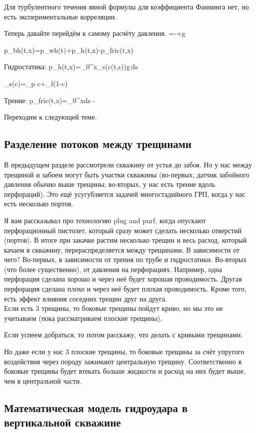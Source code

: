 \documentclass[main.tex]{subfiles}
\begin{document}
Для турбулентного течения явной формулы для коэффициента Фаннинга нет, но есть экспериментальные корреляции.

Теперь давайте перейдём к самому расчёту давления.
\beq
{}=-+\overline{\rho}g\sin{\theta}
\eeq

\beq
p_{bh}(t,x)=p_{wh}(t)+\Delta p_h(t,x)-\Delta p_{fric}(t,x)
\eeq

Гидростатика:
\beq
\Delta p_h(t,x)=\int\limits_{0}^{x}\rho_s(c(t,s))g\,ds
\eeq

\beq
\rho_s(c)=\rho_p c+\rho_f\left(1-c\right)
\eeq

Трение:
\beq
\Delta p_{fric}(t,x)=\int\limits_0^xds - 
\eeq

Переходим к следующей теме.

\subsection{Разделение потоков между трещинами}

В предыдущем разделе рассмотрели скважину от устья до забоя.
Но у нас между трещиной и забоем могут быть участки скважины (во-первых, датчик забойного давления обычно выше трещины; во-вторых, у нас есть трение вдоль перфораций).
Это ещё усугубляется задачей многостадийного ГРП, когда у нас есть несколько портов.

Я вам рассказывал про технологию plug and purf, когда опускают перфорационный пистолет, который сразу может сделать несколько отверстий (портов).
В итоге при закачке растим несколько трещин и весь расход, который качаем в скважину, перераспределяется между трещинами.
В зависимости от чего?
Во-первых, в зависимости от трения по трубе и гидростатики.
Во-вторых (что более существенно), от давления на перфорациях.
Например, одна перфорация сделана хорошо и через неё будет хорошая проводимость.
Другая перфорация сделана плохо и через неё будет плохая проводимость.
Кроме того, есть эффект влияния соседних трещин друг на друга.
\\

Если есть 3 трещины, то боковые трещины пойдут криво, но мы это не учитываем (пока рассматриваем плоские трещины).

Если успеем добраться, то потом расскажу, что делать с кривыми трещинами.

Но даже если у нас 3 плоские трещины, то боковые трещины за счёт упругого воздействия через породу зажимают центральную трещину.
Соответственно в боковые трещины будет втекать больше жидкости и расход на них будет выше, чем в центральной части.


\subsection{Математическая модель гидроудара в вертикальной скважине}
\end{document}
